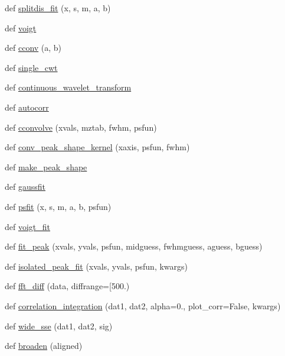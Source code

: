 \begin{DoxyCompactItemize}
\item 
def \hyperlink{namespace_uni_dec_1_1unidec__modules_1_1unidectools_a8265bf688c57e848e04a8853714f1053}{splitdis\+\_\+fit} (x, s, m, a, b)
\item 
def \hyperlink{namespace_uni_dec_1_1unidec__modules_1_1unidectools_a76a3ffb756f14e2b33e3af7c2dc56a44}{voigt}
\item 
def \hyperlink{namespace_uni_dec_1_1unidec__modules_1_1unidectools_ae5d74cbb30a250c062cd7bf5ce59fc62}{cconv} (a, b)
\item 
def \hyperlink{namespace_uni_dec_1_1unidec__modules_1_1unidectools_a43d545436321cf1cc72864c5b70a768c}{single\+\_\+cwt}
\item 
def \hyperlink{namespace_uni_dec_1_1unidec__modules_1_1unidectools_a1608b1ab61e6afa01c650f7c171fe629}{continuous\+\_\+wavelet\+\_\+transform}
\item 
def \hyperlink{namespace_uni_dec_1_1unidec__modules_1_1unidectools_a3e23d73557b7c1c3a59cab70cca8f448}{autocorr}
\item 
def \hyperlink{namespace_uni_dec_1_1unidec__modules_1_1unidectools_a5a3336bfe6601fc98072e8f1ab0d7f78}{cconvolve} (xvals, mztab, fwhm, psfun)
\item 
def \hyperlink{namespace_uni_dec_1_1unidec__modules_1_1unidectools_ae46171f956acf051bbd55b17e21d0f3d}{conv\+\_\+peak\+\_\+shape\+\_\+kernel} (xaxis, psfun, fwhm)
\item 
def \hyperlink{namespace_uni_dec_1_1unidec__modules_1_1unidectools_af6772ef09dd07efd12de2fcde13ac558}{make\+\_\+peak\+\_\+shape}
\item 
def \hyperlink{namespace_uni_dec_1_1unidec__modules_1_1unidectools_ad88667721748d2a2b549987d523861be}{gaussfit}
\item 
def \hyperlink{namespace_uni_dec_1_1unidec__modules_1_1unidectools_a44fd5a7c33befeadd1877b0ae7e90159}{psfit} (x, s, m, a, b, psfun)
\item 
def \hyperlink{namespace_uni_dec_1_1unidec__modules_1_1unidectools_a771895b7e321281646f860cb93cc11fa}{voigt\+\_\+fit}
\item 
def \hyperlink{namespace_uni_dec_1_1unidec__modules_1_1unidectools_a6861e544ee8c994a4e8fcc86eb6c441e}{fit\+\_\+peak} (xvals, yvals, psfun, midguess, fwhmguess, aguess, bguess)
\item 
def \hyperlink{namespace_uni_dec_1_1unidec__modules_1_1unidectools_a01e7da6945fc3ff376ccdd6b6c839dd5}{isolated\+\_\+peak\+\_\+fit} (xvals, yvals, psfun, kwargs)
\item 
def \hyperlink{namespace_uni_dec_1_1unidec__modules_1_1unidectools_a1f8ae9ae2eb6dd58a87e67da3a7050b7}{fft\+\_\+diff} (data, diffrange=\mbox{[}500.)
\item 
def \hyperlink{namespace_uni_dec_1_1unidec__modules_1_1unidectools_a8ee93e61f2b7e859c65a7ec0caf9a652}{correlation\+\_\+integration} (dat1, dat2, alpha=0., plot\+\_\+corr=False, kwargs)
\item 
def \hyperlink{namespace_uni_dec_1_1unidec__modules_1_1unidectools_a6d85c1fdefcfd8611d9abe3ac7183cec}{wide\+\_\+sse} (dat1, dat2, sig)
\item 
def \hyperlink{namespace_uni_dec_1_1unidec__modules_1_1unidectools_a2f7809c3f18d263f0d90a254aa6a29d1}{broaden} (aligned)
\end{DoxyCompactItemize}
